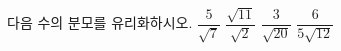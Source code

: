 다음 수의 분모를 유리화하시오.
 $\dfrac{5}{\sqrt{7}}$
 $\dfrac{\sqrt{11}}{\sqrt{2}}$
 $\dfrac{3}{\sqrt{20}}$
 $\dfrac{6}{5\sqrt{12}}$
